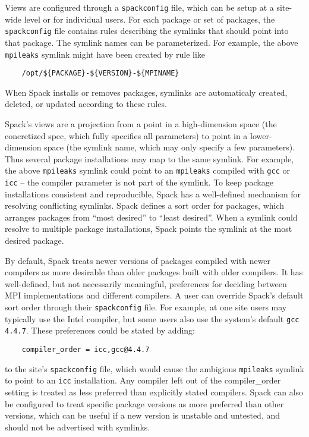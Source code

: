 Views are configured through a {\tt spackconfig} file, which can be setup at a site-wide level or for individual users.
For each package or set of packages, the {\tt spackconfig} file contains rules
describing the symlinks that should point into that package.
The symlink names can be parameterized.
For example, the above {\tt mpileaks} symlink might have been created by rule like
%
\begin{verbatim}
    /opt/${PACKAGE}-${VERSION}-${MPINAME}
\end{verbatim}
%
When Spack installs or removes packages,
symlinks are automaticaly created, deleted, or updated according to these rules.  

Spack's views are a projection from a point in a high-dimension space
(the concretized spec, which fully specifies all parameters) to point in a lower-dimension space
(the symlink name, which may only specify a few parameters).
Thus several package installations may map to the same symlink.
For example, the above {\tt mpileaks} symlink could point to an {\tt mpileaks} compiled with
{\tt gcc} or {\tt icc} -- the compiler parameter is not part of the symlink.
To keep  package installations  consistent and reproducible,
Spack has a well-defined mechanism for resolving conflicting symlinks.
Spack defines a sort order for packages, which arranges packages from ``most desired'' to ``least desired''.
When a symlink could resolve to multiple package installations,
Spack points the symlink at the most desired package.  

By default, Spack treats newer versions of packages compiled with newer compilers
as more desirable than older packages built with older compilers.
It has well-defined, but not necessarily meaningful,
preferences for deciding between MPI implementations and different compilers.
A user can override Spack's default sort order through their {\tt spackconfig} file.
For example, at one site users may typically use the Intel compiler,
but some users also use the system's default {\tt gcc 4.4.7}.
These preferences could be stated by adding:
%
\begin{verbatim}
    compiler_order = icc,gcc@4.4.7
\end{verbatim}
%
to the site's {\tt spackconfig} file, which would cause the ambigious {\tt mpileaks} symlink to point to an {\tt icc} installation.
Any compiler left out of the compiler\_order setting is treated as less preferred than explicitly stated compilers.
Spack can also be configured to treat specific package versions as more preferred than other versions,
which can be useful if a new version is unstable and untested, and should not be advertised with symlinks.  


